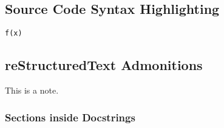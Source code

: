 \documentclass{article}
\begin{document}

\subsection{Source Code Syntax Highlighting}

\begin{alltt}
\pysrcprompt{{\textgreater}{\textgreater}{\textgreater} }f(x)
\end{alltt}

\subsection{reStructuredText Admonitions}

\newlength{\admonitionwidth}
\setlength{\admonitionwidth}{.8\textwidth}

\begin{reSTadmonition}[note]
  This is a note.
\end{reSTadmonition}

\subsubsection{Sections inside Docstrings}



\end{document}
